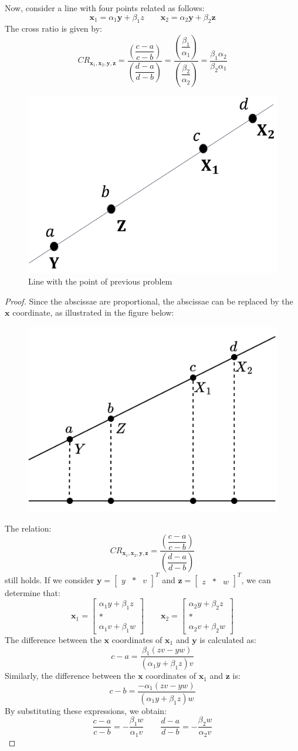 Now, consider a line with four points related as follows:
\[\mathbf{x}_1=\alpha_1\mathbf{y}+\beta_1z \qquad \mathbf{x}_2=\alpha_2\mathbf{y}+\beta_2\mathbf{z}\]
The cross ratio is given by:
\[CR_{\mathbf{x}_1,\mathbf{x}_2,\mathbf{y},\mathbf{z}}=\dfrac{\left(\dfrac{c-a}{c-b}\right)}{\left(\dfrac{d-a}{d-b}\right)}=\dfrac{\left(\dfrac{\beta_1}{\alpha_1}\right)}{\left(\dfrac{\beta_2}{\alpha_2}\right)}=\dfrac{\beta_1\alpha_2}{\beta_2\alpha_1}\]
\begin{figure}[H]
    \centering
    \includegraphics[width=0.25\linewidth]{images/line.png}
    \caption{Line with the point of previous problem}
\end{figure}
\begin{proof}
    Since the abscissae are proportional, the abscissae can be replaced by the $\mathbf{x}$ coordinate, as illustrated in the figure below:
    \begin{figure}[H]
        \centering
        \includegraphics[width=0.3\linewidth]{images/abscissae.png}
    \end{figure}
    The relation:
    \[CR_{\mathbf{x}_1,\mathbf{x}_2,\mathbf{y},\mathbf{z}}=\dfrac{\left(\dfrac{c-a}{c-b}\right)}{\left(\dfrac{d-a}{d-b}\right)}\]
    still holds. 
    If we consider $\mathbf{y}={\begin{bmatrix} y & \ast & v \end{bmatrix}}^T$ and $\mathbf{z}={\begin{bmatrix} z & \ast & w \end{bmatrix}}^T$, we can determine that:
    \[\mathbf{x}_1=\begin{bmatrix} \alpha_1y+\beta_1z \\ \ast \\ \alpha_1v+\beta_1w \end{bmatrix} \qquad \mathbf{x}_2=\begin{bmatrix} \alpha_2y+\beta_2z \\ \ast \\ \alpha_2v+\beta_2w \end{bmatrix}\]
    The difference between the $\mathbf{x}$ coordinates of $\mathbf{x}_1$ and $\mathbf{y}$ is calculated as:
    \[c-a=\dfrac{\beta_1(zv-yw)}{(\alpha_1y+\beta_1z)v}\]
    Similarly, the difference between the $\mathbf{x}$ coordinates of $\mathbf{x}_1$ and $\mathbf{z}$ is:
    \[c-b=\dfrac{-\alpha_1(zv-yw)}{(\alpha_1y+\beta_1z)w}\]
    By substituting these expressions, we obtain:
    \[\dfrac{c-a}{c-b}=-\dfrac{\beta_1w}{\alpha_1v} \qquad \dfrac{d-a}{d-b}=-\dfrac{\beta_2w}{\alpha_2v}\]
\end{proof}